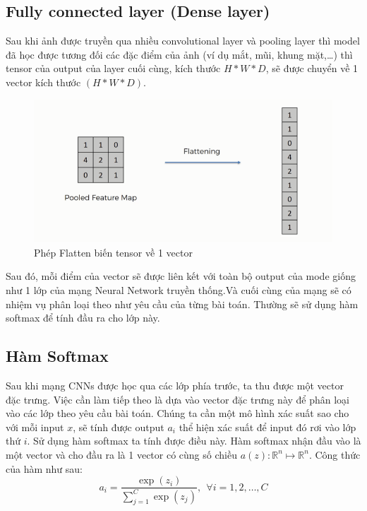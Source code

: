 \subsection{Fully connected layer (Dense layer)}
\label{ss:dense}
Sau khi ảnh được truyền qua nhiều convolutional layer và pooling layer thì model đã học được tương đối các đặc điểm của ảnh (ví dụ mắt, mũi, khung mặt,…) thì tensor của output của layer cuối cùng, kích thước $H*W*D$, sẽ được chuyển về 1 vector kích thước $(H*W*D)$.

\FloatBarrier
\begin{figure}[htp]
\begin{center}
\includegraphics[scale=1]{chap2/c2_figs/17.png}
\end{center}
\caption{Phép Flatten biến tensor về 1 vector}
\label{fig:flatten}
\end{figure}
\FloatBarrier
Sau đó, mỗi điểm của vector sẽ được liên kết với toàn bộ output của mode giống như 1 lớp của mạng Neural Network truyền thống.Và cuối cùng của mạng sẽ có nhiệm vụ phân loại theo như yêu cầu của từng bài toán. Thường sẽ sử dụng hàm softmax để tính đầu ra cho lớp này.

\subsection{Hàm Softmax}
Sau khi mạng CNNs được học qua các lớp phía trước, ta thu được một vector đặc trưng. Việc cần làm tiếp theo là dựa vào vector đặc trưng này để phân loại vào các lớp theo yêu cầu bài toán. Chúng ta cần một mô hình xác suất sao cho với mỗi input $x$, sẽ tính được output $a_i$ thể hiện xác suất để input đó rơi vào lớp thứ $i$. Sử dụng hàm softmax ta tính được điều này. Hàm softmax nhận đầu vào là một vector và cho đầu ra là 1 vector có cùng số chiều $a(z):\mathbb{R}^n\mapsto\mathbb{R}^n$. Công thức của hàm như sau:
$$a_i = \frac{\exp(z_i)}{\sum_{j=1}^C \exp(z_j)}, ~~ \forall i = 1, 2, \dots, C$$

